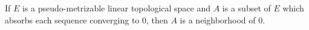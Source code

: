 If $E$ is a pseudo-metrizable linear topological space and $A$ is a subset of $E$ which absorbs each sequence converging to $0$, then $A$ is a neighborhood of $0$.
